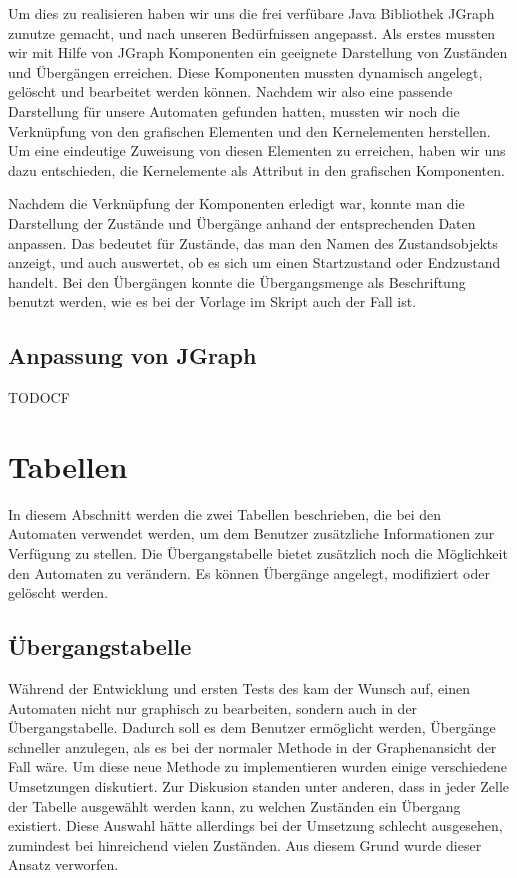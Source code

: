 Um dies zu realisieren haben wir uns die frei verfübare Java Bibliothek JGraph
zunutze gemacht, und nach unseren Bedürfnissen angepasst. Als erstes mussten
wir mit Hilfe von JGraph Komponenten ein geeignete Darstellung von Zuständen
und Übergängen erreichen. Diese Komponenten mussten dynamisch angelegt,
gelöscht und bearbeitet werden können. Nachdem wir also eine passende
Darstellung für unsere Automaten gefunden hatten, mussten wir noch die
Verknüpfung von den grafischen Elementen und den Kernelementen herstellen. Um
eine eindeutige Zuweisung von diesen Elementen zu erreichen, haben wir uns dazu
entschieden, die Kernelemente als Attribut in den grafischen Komponenten.\vspace{10pt}

Nachdem die Verknüpfung der Komponenten erledigt war, konnte man die
Darstellung der Zustände und Übergänge anhand der entsprechenden Daten
anpassen. Das bedeutet für Zustände, das man den Namen des Zustandsobjekts
anzeigt, und auch auswertet, ob es sich um einen Startzustand oder Endzustand
handelt. Bei den Übergängen konnte die Übergangsmenge als Beschriftung benutzt
werden, wie es bei der Vorlage im Skript auch der Fall ist.\vspace{10pt}



\subsection{Anpassung von JGraph}

TODOCF


\section{Tabellen}

In diesem Abschnitt werden die zwei Tabellen beschrieben, die bei den Automaten
verwendet werden, um dem Benutzer zusätzliche Informationen zur Verfügung zu
stellen. Die Übergangstabelle bietet zusätzlich noch die Möglichkeit den
Automaten zu verändern. Es können Übergänge angelegt, modifiziert oder gelöscht
werden.


\subsection{Übergangstabelle}

Während der Entwicklung und ersten Tests des \gtitools kam der Wunsch auf,
einen Automaten nicht nur graphisch zu bearbeiten, sondern auch in der
Übergangstabelle. Dadurch soll es dem Benutzer ermöglicht werden, Übergänge
schneller anzulegen, als es bei der normaler Methode in der Graphenansicht der
Fall wäre. Um diese neue Methode zu implementieren wurden einige verschiedene
Umsetzungen diskutiert. Zur Diskusion standen unter anderen, dass in jeder
Zelle der Tabelle ausgewählt werden kann, zu welchen Zuständen ein Übergang
existiert. Diese Auswahl hätte allerdings bei der Umsetzung schlecht
ausgesehen, zumindest bei hinreichend vielen Zuständen. Aus diesem Grund wurde
dieser Ansatz verworfen.\vspace{10pt}


